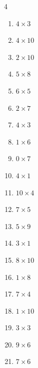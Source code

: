 \begin{multicols}{4}
\begin{enumerate}
  \item $4\times 3$
        \phantom{$=12$}

  \item $4\times 10$
        \phantom{$=40$}

  \item $2\times 10$
        \phantom{$=20$}

  \item $5\times 8$
        \phantom{$=40$}

  \item $6\times 5$
        \phantom{$=30$}

  \item $2\times 7$
        \phantom{$=14$}

  \item $4\times 3$
        \phantom{$=12$}

  \item $1\times 6$
        \phantom{$=6$}

  \item $0\times 7$
        \phantom{$=0$}

  \item $4\times 1$
        \phantom{$=4$}

  \item $10\times 4$
        \phantom{$=40$}

  \item $7\times 5$
        \phantom{$=35$}

  \item $5\times 9$
        \phantom{$=45$}

  \item $3\times 1$
        \phantom{$=3$}

  \item $8\times 10$
        \phantom{$=80$}

  \item $1\times 8$
        \phantom{$=8$}

  \item $7\times 4$
        \phantom{$=28$}

  \item $1\times 10$
        \phantom{$=10$}

\columnbreak %

  \item $3\times 3$
        \phantom{$=9$}

  \item $9\times 6$
        \phantom{$=54$}

  \item $7\times 6$
        \phantom{$=42$}


\end{enumerate}
\end{multicols}
